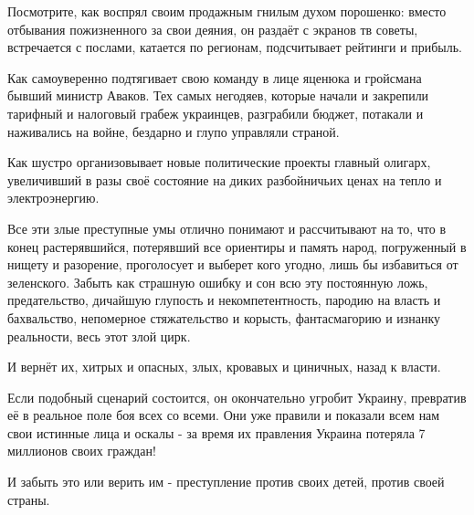 Посмотрите, как воспрял своим продажным гнилым духом порошенко: вместо
отбывания пожизненного за свои деяния, он раздаёт с экранов тв советы,
встречается с послами, катается по регионам, подсчитывает рейтинги и прибыль. 

Как самоуверенно подтягивает свою команду в лице яценюка и гройсмана бывший
министр Аваков. Тех самых негодяев, которые начали и закрепили тарифный и
налоговый грабеж украинцев, разграбили бюджет, потакали и наживались на войне,
бездарно и глупо управляли страной. 

Как шустро организовывает новые политические проекты главный олигарх,
увеличивший в разы своё состояние на диких разбойничьих ценах на тепло и
электроэнергию. 

Все эти злые преступные умы отлично понимают и рассчитывают на то, что в конец
растерявшийся, потерявший все ориентиры и память народ, погруженный в нищету и
разорение, проголосует и выберет кого угодно, лишь бы избавиться от зеленского.
Забыть как страшную ошибку и сон всю эту постоянную ложь, предательство,
дичайшую глупость и некомпетентность, пародию на власть и бахвальство,
непомерное стяжательство и корысть, фантасмагорию и изнанку реальности, весь
этот злой цирк. 

И вернёт их, хитрых и опасных, злых, кровавых и циничных, назад к власти. 

Если подобный сценарий состоится, он окончательно угробит Украину, превратив её
в реальное поле боя всех со всеми. Они уже правили и показали всем нам свои
истинные лица и оскалы - за время их правления Украина потеряла 7 миллионов
своих граждан! 

И забыть это или верить им - преступление против своих детей, против своей
страны.


